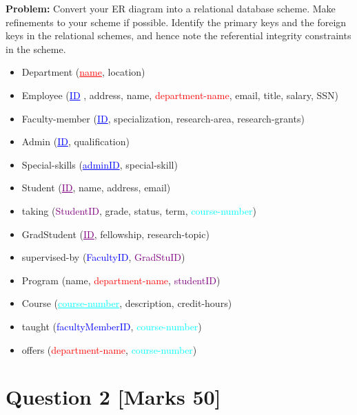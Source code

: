 \documentclass[a4paper]{article}
\begin{document}
\textbf{Problem:}
Convert your ER diagram into a relational database scheme. Make refinements to your
scheme if possible. Identify the primary keys and the foreign keys in the relational
schemes, and hence note the referential integrity constraints in the scheme.
\bigbreak
\begin{itemize}
    \item Department (\textcolor{red}{\underline{name}}, location)

    \item Employee (\textcolor{blue} {\underline{ID} }, address, name, \textcolor{red}{department-name}, email, title, salary, SSN)
    \item Faculty-member (\textcolor{blue}{\underline{ID}}, specialization, research-area, research-grants)
    \item Admin (\textcolor{blue} {\underline{ID}}, qualification)
    \item Special-skills (\textcolor{blue}{\underline{adminID}}, special-skill)

    \item Student (\textcolor{purple}{\underline{ID}}, name, address, email)
    \item taking (\textcolor{purple}{StudentID}, grade, status, term, \textcolor{cyan}{course-number})
    \item GradStudent (\textcolor{purple}{\underline{ID}}, fellowship, research-topic)
    \item supervised-by (\textcolor{blue}{FacultyID}, \textcolor{purple}{GradStuID})
    \item Program (name, \textcolor{red}{department-name}, \textcolor{purple}{studentID})

    \item Course (\textcolor{cyan}{\underline{course-number}}, description, credit-hours)
    \item taught (\textcolor{blue}{facultyMemberID}, \textcolor{cyan}{course-number})
    \item offers (\textcolor{red}{department-name}, \textcolor{cyan}{course-number})

\end{itemize}

\newpage 
\section{Question 2 [Marks 50]}
\end{document}
